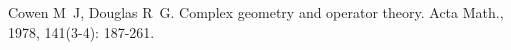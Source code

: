 \begin{thebibliography}{99}

Cowen M~J, Douglas R~G.
\newblock Complex geometry and operator theory\allowbreak[J].
\newblock Acta Math., 1978, 141\allowbreak (3-4): 187-261.

\end{thebibliography}
